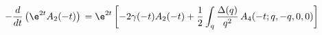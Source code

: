 \begin{equation}
- \frac{d}{dt} \left( \e^{2t} A_2 (-t) \right) \nonumber\\ = \e^{2t}
\left[ - 2 \gamma (-t) A_2 (-t) + \frac{1}{2} \int_q \frac{\Delta
(q)}{q^2} \, A_4 (-t; q,-q,0,0) \right] \label{diffAtwo}
\end{equation}

